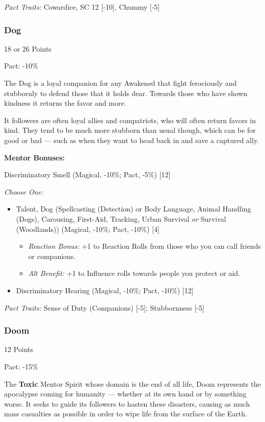 \begin{multicols}{3}
	\textit{Pact Traits:} Cowardice, SC 12 [-10], Chummy [-5]
	
	\subsubsection{Dog}
	\begin{flushright}
		18 or 26 Points
	\end{flushright}
	Pact: -10\%
	
	The Dog is a loyal companion for any Awakened that fight ferociously and stubbornly to defend those that it holds dear. Towards those who have shown kindness it returns the favor and more.
	
	It followers are often loyal allies and compatriots, who will often return favors in kind. They tend to be much more stubborn than usual though, which can be for good or bad — such as when they want to head back in and save a captured ally.
	
	\textbf{Mentor Bonuses:} 
	
	Discriminatory Smell (Magical, -10\%; Pact, -5\%) [12]
	
	\textit{Choose One:}
	\begin{itemize}
		\itemsep 0pt
		\item Talent, Dog (Spellcasting (Detection) or Body Language, Animal Handling (Dogs), Carousing, First-Aid, Tracking, Urban Survival \textit{or} Survival (Woodlands)) (Magical, -10\%; Pact, -10\%) [4]
		\begin{itemize}
			\itemsep 0pt
			\item \textit{Reaction Bonus:} +1 to Reaction Rolls from those who you can call friends or companions.
			\item \textit{Alt Benefit:} +1 to Influence rolls towards people you protect or aid.
		\end{itemize}
		\item Discriminatory Hearing (Magical, -10\%; Pact, -10\%) [12]
	\end{itemize}
	
	\textit{Pact Traits:} Sense of Duty (Companions) [-5]; Stubbornness [-5]
	
	\subsubsection{Doom}
	\begin{flushright}
		12 Points
	\end{flushright}
	Pact: -15\%
	
	The \textbf{Toxic} Mentor Spirit whose domain is the end of all life, Doom represents the apocalypse coming for humanity — whether at its own hand or by something worse. It seeks to guide its followers to hasten these disasters, causing as much mass casualties as possible in order to wipe life from the surface of the Earth.
	

\end{multicols}
